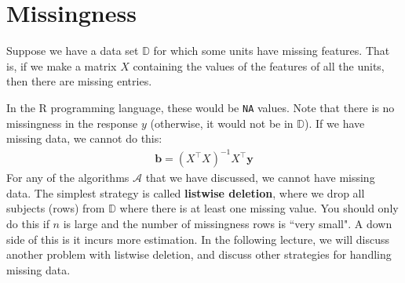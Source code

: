 \documentclass[12pt, a4paper]{article}
\theoremstyle{definition}
\begin{document}
	\section*{Missingness}
	Suppose we have a data set $\mathbb{D}$ for which some units have missing features.
	That is, if we make a matrix $X$ containing the values of the features of all
	the units, then there are missing entries.
	
	In the R programming language, these would be \texttt{NA} values. Note that there
	is no missingness in the response $y$ (otherwise, it would not be in $\mathbb{D}$).
	If we have missing data, we cannot do this:
	\begin{align*}
		\bm{b} = (X^\top X)^{-1} X^\top \bm{y}
	\end{align*}
	For any of the algorithms $\mathcal{A}$ that we have discussed, we cannot have missing data.
	The simplest strategy is called \textbf{listwise deletion}, where we drop all subjects
	(rows) from $\mathbb{D}$ where there is at least one missing value. You should only do
	this if $n$ is large and the number of missingness rows is ``very small". A down side
	of this is it incurs more estimation. In the following lecture, we will discuss
	another problem with listwise deletion, and discuss other strategies for handling
	missing data.
\end{document}

